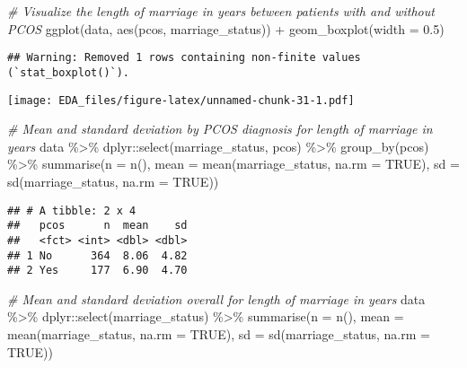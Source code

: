\documentclass[
]{article}
\newenvironment{Shaded}{\begin{snugshade}}{\end{snugshade}}
\newcommand{\AttributeTok}[1]{\textcolor[rgb]{0.77,0.63,0.00}{#1}}
\newcommand{\CommentTok}[1]{\textcolor[rgb]{0.56,0.35,0.01}{\textit{#1}}}
\newcommand{\ConstantTok}[1]{\textcolor[rgb]{0.00,0.00,0.00}{#1}}
\newcommand{\FloatTok}[1]{\textcolor[rgb]{0.00,0.00,0.81}{#1}}
\newcommand{\FunctionTok}[1]{\textcolor[rgb]{0.00,0.00,0.00}{#1}}
\newcommand{\NormalTok}[1]{#1}
\newcommand{\SpecialCharTok}[1]{\textcolor[rgb]{0.00,0.00,0.00}{#1}}
\begin{document}
\begin{Shaded}
\begin{Highlighting}[]
\CommentTok{\# Visualize the length of marriage in years between patients with and without PCOS}
\FunctionTok{ggplot}\NormalTok{(data, }\FunctionTok{aes}\NormalTok{(pcos, marriage\_status)) }\SpecialCharTok{+} \FunctionTok{geom\_boxplot}\NormalTok{(}\AttributeTok{width =} \FloatTok{0.5}\NormalTok{)}
\end{Highlighting}
\end{Shaded}

\begin{verbatim}
## Warning: Removed 1 rows containing non-finite values (`stat_boxplot()`).
\end{verbatim}

\texttt{[image: EDA\_files/figure-latex/unnamed-chunk-31-1.pdf]}

\begin{Shaded}
\begin{Highlighting}[]
\CommentTok{\# Mean and standard deviation by PCOS diagnosis for length of marriage in years}
\NormalTok{data }\SpecialCharTok{\%\textgreater{}\%}\NormalTok{ dplyr}\SpecialCharTok{::}\FunctionTok{select}\NormalTok{(marriage\_status, pcos) }\SpecialCharTok{\%\textgreater{}\%} \FunctionTok{group\_by}\NormalTok{(pcos) }\SpecialCharTok{\%\textgreater{}\%} 
  \FunctionTok{summarise}\NormalTok{(}\AttributeTok{n =} \FunctionTok{n}\NormalTok{(), }
            \AttributeTok{mean =} \FunctionTok{mean}\NormalTok{(marriage\_status, }\AttributeTok{na.rm =} \ConstantTok{TRUE}\NormalTok{), }
            \AttributeTok{sd =} \FunctionTok{sd}\NormalTok{(marriage\_status, }\AttributeTok{na.rm =} \ConstantTok{TRUE}\NormalTok{))}
\end{Highlighting}
\end{Shaded}

\begin{verbatim}
## # A tibble: 2 x 4
##   pcos      n  mean    sd
##   <fct> <int> <dbl> <dbl>
## 1 No      364  8.06  4.82
## 2 Yes     177  6.90  4.70
\end{verbatim}

\begin{Shaded}
\begin{Highlighting}[]
\CommentTok{\# Mean and standard deviation overall for length of marriage in years}
\NormalTok{data }\SpecialCharTok{\%\textgreater{}\%}\NormalTok{ dplyr}\SpecialCharTok{::}\FunctionTok{select}\NormalTok{(marriage\_status) }\SpecialCharTok{\%\textgreater{}\%} 
  \FunctionTok{summarise}\NormalTok{(}\AttributeTok{n =} \FunctionTok{n}\NormalTok{(), }
            \AttributeTok{mean =} \FunctionTok{mean}\NormalTok{(marriage\_status, }\AttributeTok{na.rm =} \ConstantTok{TRUE}\NormalTok{), }
            \AttributeTok{sd =} \FunctionTok{sd}\NormalTok{(marriage\_status, }\AttributeTok{na.rm =} \ConstantTok{TRUE}\NormalTok{))}
\end{Highlighting}
\end{Shaded}
\end{document}
